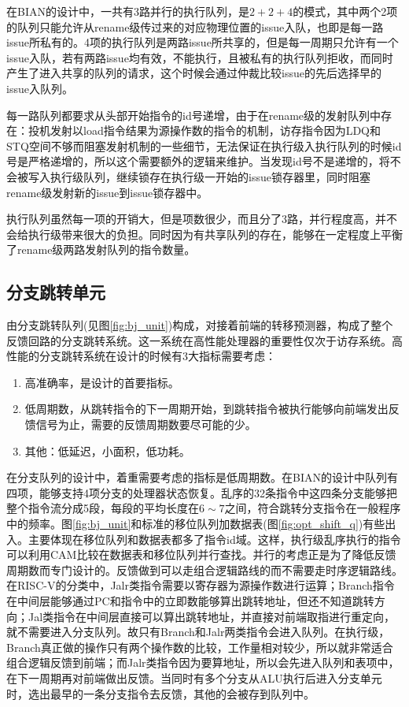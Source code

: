 在BIAN的设计中，一共有3路并行的执行队列，是$ 2 + 2 + 4 $的模式，其中两个2项的队列只能允许从rename级传过来的对应物理位置的issue入队，也即是每一路issue所私有的。4项的执行队列是两路issue所共享的，但是每一周期只允许有一个issue入队，若有两路issue均有效，不能执行，且被私有的执行队列拒收，而同时产生了进入共享的队列的请求，这个时候会通过仲裁比较issue的先后选择早的issue入队列。

每一路队列都要求从头部开始指令的id号递增，由于在rename级的发射队列中存在：投机发射以load指令结果为源操作数的指令的机制，访存指令因为LDQ和STQ空间不够而阻塞发射机制的一些细节，无法保证在执行级入执行队列的时候id号是严格递增的，所以这个需要额外的逻辑来维护。当发现id号不是递增的，将不会被写入执行级队列，继续锁存在执行级一开始的issue锁存器里，同时阻塞rename级发射新的issue到issue锁存器中。

执行队列虽然每一项的开销大，但是项数很少，而且分了3路，并行程度高，并不会给执行级带来很大的负担。同时因为有共享队列的存在，能够在一定程度上平衡了rename级两路发射队列的指令数量。

\subsection{分支跳转单元}\label{subsec:bj_unit}

由分支跳转队列(见图\ref{fig:bj_unit})构成，对接着前端的转移预测器，构成了整个反馈回路的分支跳转系统。这一系统在高性能处理器的重要性仅次于访存系统。高性能的分支跳转系统在设计的时候有3大指标需要考虑：
\begin{enumerate}[label=(\alph*)]
	\item 高准确率，是设计的首要指标。
	\item 低周期数，从跳转指令的下一周期开始，到跳转指令被执行能够向前端发出反馈信号为止，需要的反馈周期数要尽可能的少。
	\item 其他：低延迟，小面积，低功耗。
\end{enumerate}

在分支队列的设计中，着重需要考虑的指标是低周期数。在BIAN的设计中队列有四项，能够支持4项分支的处理器状态恢复。乱序的32条指令中这四条分支能够把整个指令流分成5段，每段的平均长度在$6\sim7$之间，符合跳转分支指令在一般程序中的频率。图\ref{fig:bj_unit}和标准的移位队列加数据表(图\ref{fig:opt_shift_q})有些出入。主要体现在移位队列和数据表都多了指令id域。这样，执行级乱序执行的指令可以利用CAM比较在数据表和移位队列并行查找。并行的考虑正是为了降低反馈周期数而专门设计的。反馈做到可以走组合逻辑路线的而不需要走时序逻辑路线。在RISC-V的分类中，Jalr类指令需要以寄存器为源操作数进行运算；Branch指令在中间层能够通过PC和指令中的立即数能够算出跳转地址，但还不知道跳转方向；Jal类指令在中间层直接可以算出跳转地址，并直接对前端取指进行重定向，就不需要进入分支队列。故只有Branch和Jalr两类指令会进入队列。在执行级，Branch真正做的操作只有两个操作数的比较，工作量相对较少，所以就非常适合组合逻辑反馈到前端；而Jalr类指令因为要算地址，所以会先进入队列和表项中，在下一周期再对前端做出反馈。当同时有多个分支从ALU执行后进入分支单元时，选出最早的一条分支指令去反馈，其他的会被存到队列中。

